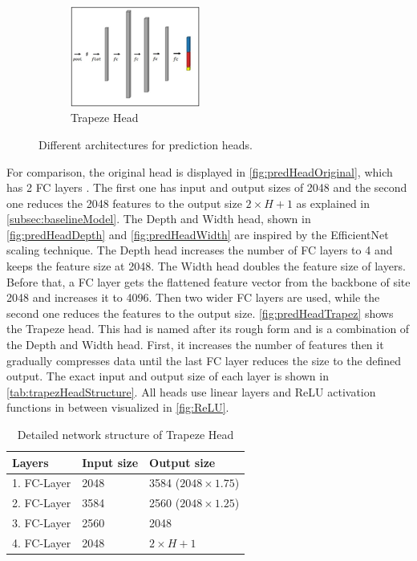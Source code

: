 \begin{figure}[H]
    \begin{subfigure}[t]{0.26\textwidth}
        \centering
        \includegraphics[height=3.3cm, keepaspectratio]{PICs/improvedModel/trapezHead.jpg}
        \caption{Trapeze Head}
        \label{fig:predHeadTrapez}
    \end{subfigure}
    \caption{Different architectures for prediction heads.}
    \label{fig:differentpredHeads}
\end{figure}

For comparison, the original head is displayed in \autoref{fig:predHeadOriginal}, which has 2 \ac{FC} layers \cite{pytorch_linearLayer_docu}.
The first one has input and output sizes of 2048 and the second one reduces the 2048 features to the output size $2 \times H + 1$ as explained in \autoref{subsec:baselineModel}.
The Depth and Width head, shown in \autoref{fig:predHeadDepth} and \autoref{fig:predHeadWidth} are inspired by the EfficientNet \cite{EfficientNet} scaling technique.
The Depth head increases the number of \ac{FC} layers to 4 and keeps the feature size at 2048.
The Width head doubles the feature size of layers.
Before that, a \ac{FC} layer gets the flattened feature vector from the backbone of site 2048 and increases it to 4096.
Then two wider \ac{FC} layers are used, while the second one reduces the features to the output size.
\autoref{fig:predHeadTrapez} shows the Trapeze head.
This had is named after its rough form and is a combination of the Depth and Width head.
First, it increases the number of features then it gradually compresses data until the last \ac{FC} layer reduces the size to the defined output.
The exact input and output size of each layer is shown in \autoref{tab:trapezHeadStructure}.
All heads use linear layers \cite{pytorch_linearLayer_docu} and \ac{ReLU} activation functions \cite{pytorch_relu_docu} in between visualized in \autoref{fig:ReLU}.

\begin{table}[H]
    \centering
    \begin{tabular}{|l|l|l|}
        \hline
        \textbf{Layers} & \textbf{Input size} & \textbf{Output size}\\
        \hline
        1. FC-Layer & 2048 & 3584 ($2048 \times 1.75$)\\
        \hline
        2. FC-Layer & 3584 & 2560 ($2048 \times 1.25$)\\
        \hline
        3. FC-Layer & 2560 & 2048\\
        \hline
        4. FC-Layer & 2048 & \(2 \times H + 1\)\\
        \hline
    \end{tabular}
    \caption{Detailed network structure of Trapeze Head}
    \label{tab:trapezHeadStructure}
\end{table}

